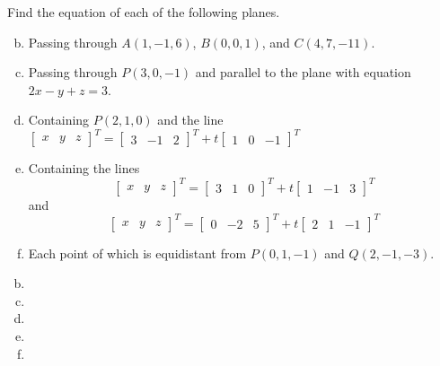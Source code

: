 \documentclass[../main.tex]{subfiles}
\begin{document}
Find the equation of each of the following planes.
\begin{enumerate}[a)]
	\setcounter{enumi}{1}
	\item Passing through $A(1, -1, 6)$, $B(0, 0, 1)$, and $C(4, 7, -11)$.
	\setcounter{enumi}{3}
	\item Passing through $P(3, 0, -1)$ and parallel to the plane with equation $2x - y + z = 3$.
	\setcounter{enumi}{5}
	\item Containing $P(2, 1, 0)$ and the line
		\(
			\begin{bmatrix}x&y&z\end{bmatrix}^T
			=
			\begin{bmatrix}3&-1&2\end{bmatrix}^T
			+
			t\begin{bmatrix}1&0&-1\end{bmatrix}^T
		\)
	\setcounter{enumi}{7}
	\item Containing the lines
		\[
			\begin{bmatrix}x&y&z\end{bmatrix}^T
			=
			\begin{bmatrix}3&1&0\end{bmatrix}^T
			+
			t\begin{bmatrix}1&-1&3\end{bmatrix}^T
		\]
		and
		\[
			\begin{bmatrix}x&y&z\end{bmatrix}^T
			=
			\begin{bmatrix}0&-2&5\end{bmatrix}^T
			+
			t\begin{bmatrix}2&1&-1\end{bmatrix}^T
		\]
	\setcounter{enumi}{9}
	\item Each point of which is equidistant from $P(0, 1, -1)$ and $Q(2, -1, -3)$.
\end{enumerate}

\solution
\begin{enumerate}[a)]
	\setcounter{enumi}{1}
	\item 
	\setcounter{enumi}{3}
	\item 
	\setcounter{enumi}{5}
	\item 
	\setcounter{enumi}{7}
	\item 
	\setcounter{enumi}{9}
	\item 
\end{enumerate}
\end{document}

